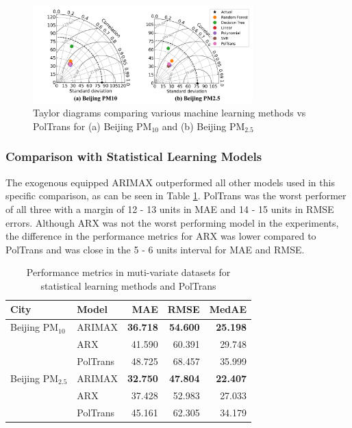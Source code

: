 \documentclass[10pt,journal]{IEEEtran}
\begin{document}
\begin{figure}[h]
\centering
\includegraphics[width=8.5cm]{../paper_figures/merged_taylor_m_ml.png}
\caption{Taylor diagrams comparing various machine learning methods vs {PolTrans} for (a) Beijing PM${_{10}}$ and (b) Beijing PM${_{2.5}}$}
\label{fig:m_ml-taylor}
\end{figure}

\subsubsection{Comparison with Statistical Learning Models}

The exogenous equipped ARIMAX outperformed all other models used in this specific comparison, as can be seen in Table \ref{tbl:m_stat-performance}. {PolTrans} was the worst performer of all three with a margin of 12 - 13 units in MAE and 14 - 15 units in RMSE errors. Although ARX was not the worst performing model in the experiments, the difference in the performance metrics for ARX was lower compared to PolTrans and was close in the 5 - 6 units interval for MAE and RMSE.

\begin{table}[h]
\small
\centering
\tabcolsep=0.16cm
\caption{Performance metrics in muti-variate datasets for statistical learning methods and PolTrans}
\label{tbl:m_stat-performance}
\begin{tabular}{llrrr}
\toprule
City & Model & MAE & RMSE & MedAE \\
\midrule
Beijing PM${_{10}}$ & ARIMAX & \textbf{36.718} & \textbf{54.600} & \textbf{25.198} \\
& ARX & 41.590 & 60.391 & 29.748 \\
& PolTrans & 48.725 & 68.457 & 35.999 \\
Beijing PM${_{2.5}}$ & ARIMAX & \textbf{32.750} & \textbf{47.804} & \textbf{22.407} \\
& ARX & 37.428 & 52.983 & 27.033 \\
& PolTrans & 45.161 & 62.305 & 34.179 \\
\bottomrule
\end{tabular}
\end{table}
\end{document}
